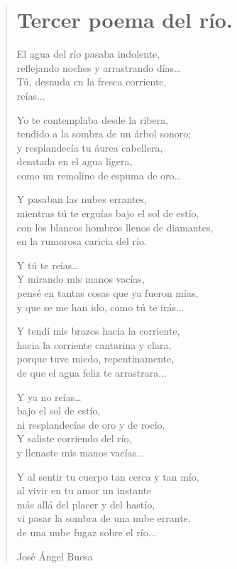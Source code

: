 \documentclass[11pt, portrait, twoside, notitlepage, openright]{book}
\begin{document}
\newpage
\begin{verse}
\begin{center}
\section{Tercer poema del río.}
\end{center}
El agua del río pasaba indolente,\\
reflejando noches y arrastrando días…\\
Tú, desnuda en la fresca corriente,\\
reías...
\newline

Yo te contemplaba desde la ribera,\\
tendido a la sombra de un árbol sonoro;\\
y resplandecía tu áurea cabellera,\\
desatada en el agua ligera,\\
como un remolino de espuma de oro…
\newline

Y pasaban las nubes errantes,\\
mientras tú te erguías bajo el sol de estío,\\
con los blancos hombros llenos de diamantes,\\
en la rumorosa caricia del río.
\newline

Y tú te reías…\\
Y mirando mis manos vacías,\\
pensé en tantas cosas que ya fueron mías,\\
y que se me han ido, como tú te irás...
\newpage

Y tendí mis brazos hacia la corriente,\\
hacia la corriente cantarina y clara,\\
porque tuve miedo, repentinamente,\\
de que el agua feliz te arrastrara...
\newline

Y ya no reías…\\
bajo el sol de estío,\\
ni resplandecías de oro y de rocío.\\
Y saliste corriendo del río,\\
y llenaste mis manos vacías...
\newline

Y al sentir tu cuerpo tan cerca y tan mío,\\
al vivir en tu amor un instante\\
más allá del placer y del hastío,\\
vi pasar la sombra de una nube errante,\\
de una nube fugaz sobre el río...
\newline

José Ángel Buesa
\end{verse}
\end{document}

